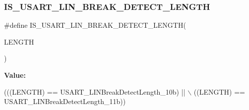\subsubsection{\texorpdfstring{I\+S\+\_\+\+U\+S\+A\+R\+T\+\_\+\+L\+I\+N\+\_\+\+B\+R\+E\+A\+K\+\_\+\+D\+E\+T\+E\+C\+T\+\_\+\+L\+E\+N\+G\+TH}{IS\_USART\_LIN\_BREAK\_DETECT\_LENGTH}}
{\footnotesize\ttfamily \#define I\+S\+\_\+\+U\+S\+A\+R\+T\+\_\+\+L\+I\+N\+\_\+\+B\+R\+E\+A\+K\+\_\+\+D\+E\+T\+E\+C\+T\+\_\+\+L\+E\+N\+G\+TH(\begin{DoxyParamCaption}\item[{}]{L\+E\+N\+G\+TH }\end{DoxyParamCaption})}

{\bfseries Value\+:}
\begin{DoxyCode}
(((LENGTH) == USART\_LINBreakDetectLength\_10b) || \(\backslash\)
                                ((LENGTH) == USART\_LINBreakDetectLength\_11b))
\end{DoxyCode}
